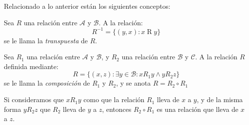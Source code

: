   Relacionado a lo anterior están los siguientes conceptos:
  \begin{definition}
    Sea \(R\) una relación entre \(\mathcal{A}\) y \(\mathcal{B}\).
    A la relación:
    \begin{equation*}
      R^{-1}
	= \{(y, x) \colon x \mathrel{R} y\}
    \end{equation*}
    se le llama la \emph{transpuesta} de \(R\).
  \end{definition}
  \begin{definition}
    Sea \(R_1\) una relación entre \(\mathcal{A}\) y \(\mathcal{B}\),
    y \(R_2\) una relación entre \(\mathcal{B}\) y \(\mathcal{C}\).
    A la relación \(R\) definida mediante:
    \begin{equation*}
      R = \{(x, z) \colon \exists y \in \mathcal{B} \colon
			    x \mathrel{R_1} y \wedge y \mathrel{R_2} z\}
    \end{equation*}
    se le llama la \emph{composición} de \(R_1\) y \(R_2\),
    y se anota \(R = R_2 \circ R_1\)
  \end{definition}
  Si consideramos que \(x \mathrel{R_1} y\)
  como que la relación \(R_1\) lleva de \(x\) a \(y\),
  y de la misma forma \(y \mathrel{R_2} z\)
  que \(R_2\) lleva de \(y\) a \(z\),
  entonces \(R_2 \circ R_1\)
  es una relación que lleva de \(x\) a \(z\).

